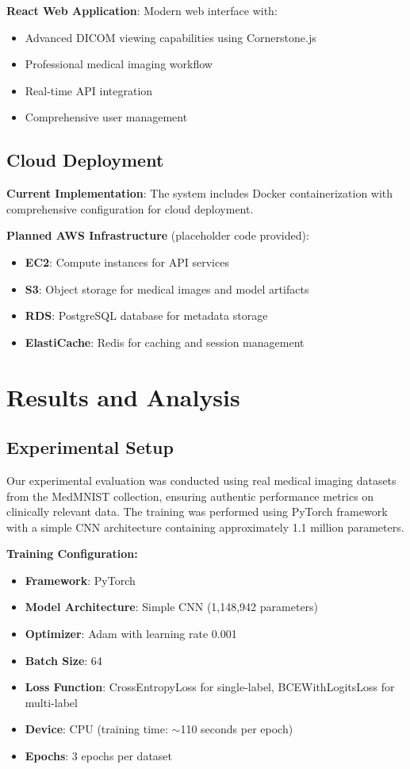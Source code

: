 \documentclass[12pt,a4paper]{article}
\begin{document}
\textbf{React Web Application}: Modern web interface with:
\begin{itemize}
    \item Advanced DICOM viewing capabilities using Cornerstone.js
    \item Professional medical imaging workflow
    \item Real-time API integration
    \item Comprehensive user management
\end{itemize}

\subsection{Cloud Deployment}

\textbf{Current Implementation}: The system includes Docker containerization with comprehensive configuration for cloud deployment.

\textbf{Planned AWS Infrastructure} (placeholder code provided):
\begin{itemize}
    \item \textbf{EC2}: Compute instances for API services
    \item \textbf{S3}: Object storage for medical images and model artifacts
    \item \textbf{RDS}: PostgreSQL database for metadata storage
    \item \textbf{ElastiCache}: Redis for caching and session management
\end{itemize}

\section{Results and Analysis}

\subsection{Experimental Setup}

Our experimental evaluation was conducted using real medical imaging datasets from the MedMNIST collection, ensuring authentic performance metrics on clinically relevant data. The training was performed using PyTorch framework with a simple CNN architecture containing approximately 1.1 million parameters.

\textbf{Training Configuration:}
\begin{itemize}
    \item \textbf{Framework}: PyTorch
    \item \textbf{Model Architecture}: Simple CNN (1,148,942 parameters)
    \item \textbf{Optimizer}: Adam with learning rate 0.001
    \item \textbf{Batch Size}: 64
    \item \textbf{Loss Function}: CrossEntropyLoss for single-label, BCEWithLogitsLoss for multi-label
    \item \textbf{Device}: CPU (training time: $\sim$110 seconds per epoch)
    \item \textbf{Epochs}: 3 epochs per dataset
\end{itemize}
\end{document}
